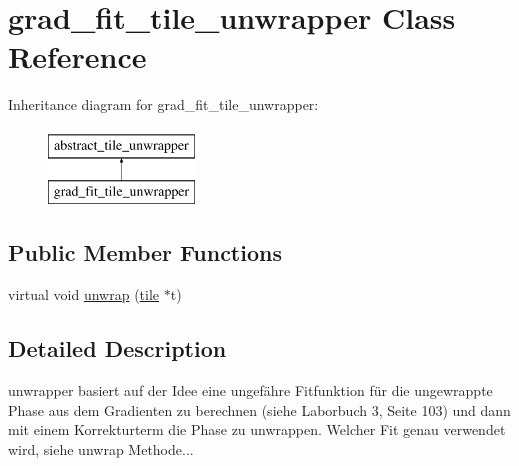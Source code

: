 \hypertarget{classgrad__fit__tile__unwrapper}{\section{grad\-\_\-fit\-\_\-tile\-\_\-unwrapper Class Reference}
\label{classgrad__fit__tile__unwrapper}
}
Inheritance diagram for grad\-\_\-fit\-\_\-tile\-\_\-unwrapper\-:\begin{figure}[H]
\begin{center}
\leavevmode
\includegraphics[height=2.000000cm]{classgrad__fit__tile__unwrapper}
\end{center}
\end{figure}
\subsection*{Public Member Functions}
\begin{DoxyCompactItemize}
\item 
virtual void \hyperlink{classgrad__fit__tile__unwrapper_a70d549d7495cce665329c2968953d418}{unwrap} (\hyperlink{classtile}{tile} $\ast$t)
\end{DoxyCompactItemize}


\subsection{Detailed Description}
unwrapper basiert auf der Idee eine ungefähre Fitfunktion für die ungewrappte Phase aus dem Gradienten zu berechnen (siehe Laborbuch 3, Seite 103) und dann mit einem Korrekturterm die Phase zu unwrappen. Welcher Fit genau verwendet wird, siehe unwrap Methode... 

